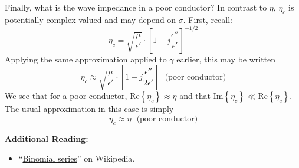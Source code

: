 Finally, what is the wave impedance 
in a poor conductor?  In contrast to $\eta$, $\eta_c$ is potentially complex-valued and may depend on $\sigma$.
First, recall:
%
\begin{equation}
\eta_c = \sqrt{\frac{\mu}{\epsilon'}} \cdot \left[ 1-j\frac{\epsilon''}{\epsilon'} \right]^{-1/2}
\end{equation}
%
Applying the same approximation applied to $\gamma$ earlier, this may be written
%
\begin{equation}
\eta_c \approx \sqrt{\frac{\mu}{\epsilon'}} \cdot \left[ 1-j\frac{\epsilon''}{2\epsilon'} \right]~~~\mbox{(poor conductor)}
\end{equation}
%
We see that for a poor conductor, Re$\left\{\eta_c\right\}\approx\eta$ and that Im$\left\{\eta_c\right\}\ll\mbox{Re}\left\{\eta_c\right\}$.
The usual approximation in this case is simply
%
\begin{equation}
\boxed{
\eta_c \approx \eta ~~~\mbox{(poor conductor)}
}
\end{equation}


{\bf Additional Reading:}
\begin{itemize}
\item ``\href{https://en.wikipedia.org/wiki/Binomial_series}{Binomial series}'' on Wikipedia.
\end{itemize}



